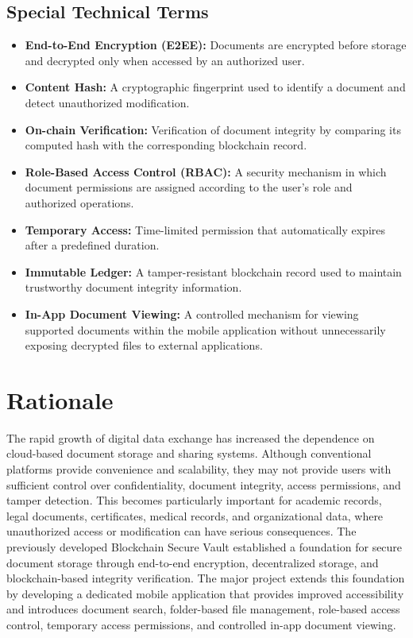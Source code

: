 \documentclass[12pt]{article}
\begin{document}
\subsection{Special Technical Terms}
\begin{itemize}
\item \textbf{End-to-End Encryption (E2EE):} Documents are encrypted before storage and decrypted only when accessed by an authorized user.
\item \textbf{Content Hash:} A cryptographic fingerprint used to identify a document and detect unauthorized modification.
\item \textbf{On-chain Verification:} Verification of document integrity by comparing its computed hash with the corresponding blockchain record.
\item \textbf{Role-Based Access Control (RBAC):} A security mechanism in which document permissions are assigned according to the user's role and authorized operations.
\item \textbf{Temporary Access:} Time-limited permission that automatically expires after a predefined duration.
\item \textbf{Immutable Ledger:} A tamper-resistant blockchain record used to maintain trustworthy document integrity information.
\item \textbf{In-App Document Viewing:} A controlled mechanism for viewing supported documents within the mobile application without unnecessarily exposing decrypted files to external applications.
\end{itemize}

\newpage
\section{Rationale}

The rapid growth of digital data exchange has increased the dependence on cloud-based document storage and sharing systems. Although conventional platforms provide convenience and scalability, they may not provide users with sufficient control over confidentiality, document integrity, access permissions, and tamper detection. This becomes particularly important for academic records, legal documents, certificates, medical records, and organizational data, where unauthorized access or modification can have serious consequences. The previously developed Blockchain Secure Vault established a foundation for secure document storage through end-to-end encryption, decentralized storage, and blockchain-based integrity verification. The major project extends this foundation by developing a dedicated mobile application that provides improved accessibility and introduces document search, folder-based file management, role-based access control, temporary access permissions, and controlled in-app document viewing.
\end{document}
